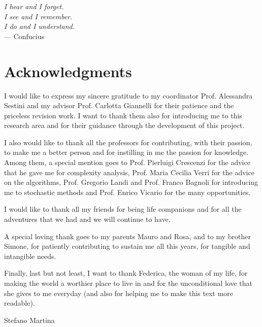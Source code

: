 
\begin{flushright}{
    \slshape
    I hear and I forget.\\
    I see and I remember.\\
    I do and I understand.} \\ \medskip
    --- Confucius
\end{flushright}

\bigskip

\begingroup
\let\clearpage\relax
\let\cleardoublepage\relax
\let\cleardoublepage\relax
\chapter*{Acknowledgments}
I would like to express my sincere gratitude to my coordinator
Prof. Alessandra Sestini and my advisor 
Prof. Carlotta Giannelli for their patience and the priceless revision
work. I want to thank them also for introducing me to this research
area and for their guidance through the development of this project.

I also would like to thank all the professors for contributing, with
their passion, to make me a better person and for instilling in me the
passion for knowledge. Among them, a special mention goes to
Prof. Pierluigi Crescenzi for the advice that he gave me for
complexity analysis, Prof. Maria Cecilia Verri for the advice on the
algorithms, Prof. Gregorio Landi and Prof. Franco Bagnoli for
introducing me to stochastic methods and Prof. Enrico Vicario for the many
opportunities.

I would like to thank all my friends for being life companions and for
all the adventures that we had and we will continue to have.

A special loving thank goes to my parents Mauro and Rosa, and to my
brother Simone, for patiently 
contributing to sustain me all this years, for tangible and
intangible needs.

Finally, last but not least, I want to thank
Federica, the woman of my life, for making the world a worthier place
to live in 
and for the 
unconditional love that she gives to me everyday (and also for
helping me to make this text more readable).

\begin{flushright}{\calligra
Stefano Martina}
\end{flushright}
\endgroup




